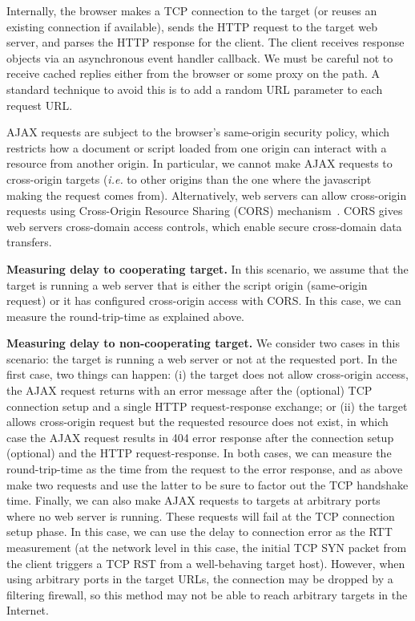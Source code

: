 \documentclass[12pt,twoside]{book}
\begin{document}
Internally, the browser makes a TCP connection to the target (or reuses an existing connection if available),
sends the HTTP request to the target web server, and parses the HTTP response for the client. The client receives response objects via an asynchronous event handler callback. 
We must be careful not to receive cached replies either from the browser or some proxy on the path. A standard technique to avoid this is to add a random URL parameter to each request URL.

AJAX requests are subject to the browser's same-origin security policy, which restricts how a document or script loaded from one origin can interact with a resource from another origin. In particular, we cannot make AJAX requests to cross-origin targets (\emph{i.e.} to other origins than the one where the javascript making the request comes from). Alternatively, web servers can allow cross-origin requests using Cross-Origin Resource Sharing (CORS) mechanism~\cite{cors}. CORS gives web servers cross-domain access controls, which enable secure cross-domain data transfers.

\textbf{Measuring delay to cooperating target.} In this scenario, we assume that the target is running a web server that is either the script origin (same-origin request) or it has configured cross-origin access with CORS. In this case, we can measure the round-trip-time as explained above.%

\textbf{Measuring delay to non-cooperating target.} We consider two cases in this scenario: the target is running a web server or not at the requested port. In the first case, two things can happen: (i) the target does not allow cross-origin access, the AJAX request returns with an error message after the (optional) TCP connection setup and a single HTTP request-response exchange; or (ii) the target allows cross-origin request but the requested resource does not exist, in which case the AJAX request results in 404 error response after the connection setup (optional) and the HTTP request-response. In both cases, we can measure the round-trip-time as the time from the request to the error response, and as above make two requests and use the latter to be sure to factor out the TCP handshake time. Finally, we can also make AJAX requests to targets at arbitrary ports where no web server is running. These requests will fail at the TCP connection setup phase. In this case, we can use the delay to connection error as the RTT measurement (at the network level in this case, the initial TCP SYN packet from the client triggers a TCP RST from a well-behaving target host). However, when using arbitrary ports in the target URLs, the connection may be dropped by a filtering firewall, so this method may not be able to reach arbitrary targets in the Internet.
\end{document}
